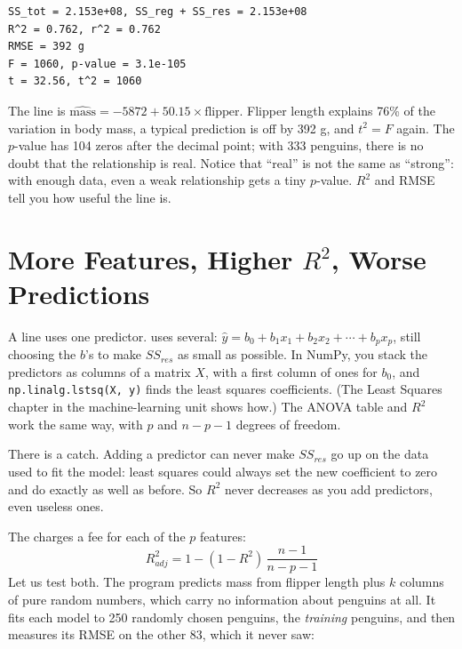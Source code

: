 \begin{verbatim}
SS_tot = 2.153e+08, SS_reg + SS_res = 2.153e+08
R^2 = 0.762, r^2 = 0.762
RMSE = 392 g
F = 1060, p-value = 3.1e-105
t = 32.56, t^2 = 1060
\end{verbatim}

The line is $\widehat{\text{mass}} = -5872 + 50.15 \times \text{flipper}$. Flipper length explains 76\% of the
variation in body mass, a typical prediction is off by 392 g, and $t^2 = F$ again. The
$p$-value has 104 zeros after the decimal point; with 333 penguins, there is no doubt that the relationship
is real. Notice that ``real'' is not the same as ``strong'': with enough data, even a weak relationship gets a
tiny $p$-value. $R^2$ and RMSE tell you how useful the line is.

\section{More Features, Higher \texorpdfstring{$R^2$}{R-squared}, Worse Predictions}
A line uses one predictor.  uses several:
$\hat{y} = b_0 + b_1 x_1 + b_2 x_2 + \cdots + b_p x_p$, still choosing the $b$'s to make $SS_{res}$ as small as
possible. In NumPy, you stack the predictors as columns of a matrix $X$, with a first column of ones for $b_0$,
and \verb|np.linalg.lstsq(X, y)| finds the least squares coefficients. (The Least Squares chapter in the
machine-learning unit shows how.) The ANOVA table and $R^2$ work the same way, with $p$ and $n - p - 1$ degrees of
freedom.

There is a catch. Adding a predictor can never make $SS_{res}$ go up on the data used to fit the model: least
squares could always set the new coefficient to zero and do exactly as well as before. So $R^2$ never decreases
as you add predictors, even useless ones.

The  charges a fee for each of the $p$ features:
$$R^2_{adj} = 1 - (1 - R^2)\,\frac{n - 1}{n - p - 1}$$
Let us test both. The program  predicts mass from flipper length plus $k$ columns of
pure random numbers, which carry no information about penguins at all. It fits each model to 250 randomly chosen
penguins, the \emph{training} penguins, and then measures its RMSE on the other 83, which it never saw:

